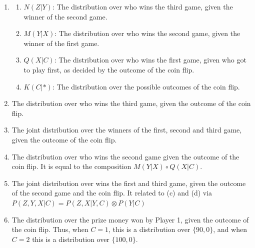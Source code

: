 \begin{enumerate}[label=3.\arabic*]
    \begin{ungradedsolution}
        \begin{enumerate}
            \item
            \begin{enumerate}
                \item $N(Z|Y)$: The distribution over who wins the third game, given the winner of the second game.
                \item $M(Y|X)$: The distribution over who wins the second game, given the winner of the first game.
                \item $Q(X|C)$: The distribution over who wins the first game, given who got to play first, as decided by the outcome of the coin flip.
                \item $K(C|*)$: The distribution over the possible outcomes of the coin flip.
            \end{enumerate}
            \item The distribution over who wins the third game, given the outcome of the coin flip.
            \item The joint distribution over the winners of the first, second and third game, given the outcome of the coin flip.
            \item The distribution over who wins the second game given the outcome of the coin flip. It is equal to the composition $M(Y|X)\circ Q(X|C)$.
            \item The joint distribution over wins the first and third game, given the outcome of the second game and the coin flip. It related to (c) and (d) via $P(Z, Y, X|C) = P(Z, X|Y, C) \otimes P(Y|C)$
            \item The distribution over the prize money won by Player 1, given the outcome of the coin flip. Thus, when $C=1$, this is a distribution over $\{90,0\}$, and when $C=2$ this is a distribution over $\{100,0\}$.
        \end{enumerate}
    \end{ungradedsolution}


\end{enumerate}
